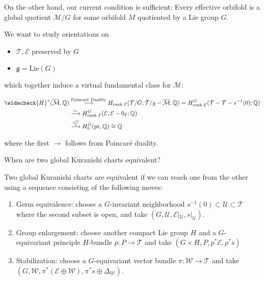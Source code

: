 On the other hand, our current condition is sufficient: Every effective orbifold is a global quotient $\mathcal{M}/G$ for some orbifold $M$ quotiented by a Lie group $G$.

We want to study orientations on
\begin{itemize}
\item $\mathcal{T}, \mathcal{E}$ preserved by $G$
\item $\mathfrak{g}=\text{Lie}(G)$
\end{itemize}

which together induce a virtual fundamental class for $\overline{\mathcal{M}}$:

\begin{align*}
\widecheck{H}^*(\overline{\mathcal{M}}, \mathbb{Q}) &\stackrel{\text{Poincaré Duality}}{\longrightarrow}H_{\text{rank } \mathcal{E}} (\mathcal{T}/G; \mathcal{T}/g - \overline{\mathcal{M}}, \mathbb{Q}) = H_{\text{rank } \mathcal{E}}^G (\mathcal{T}- \mathcal{T}-s^{-1}(0); \mathbb{Q}) \\
&\stackrel{s_*}{\longrightarrow} H_{\text{rank }\mathcal{E}}^G (\mathcal{E}, \mathcal{E}- 0_{\mathcal{E}}; \mathbb{Q}) \\
&\stackrel{\tau_{\mathcal{E}}^G}{\longrightarrow} H_0^G(\text{pt}, \mathbb{Q})\cong \mathbb{Q}
\end{align*}

where the first $\longrightarrow$ follows from Poincaré duality.

\begin{problem}

When are two global Kuranishi charts equivalent?

\end{problem}

\begin{proposition}

Two global Kuranishi charts are equivalent if we can reach one from the other using a sequence consisting of the following moves:
\begin{enumerate}
\item Germ equivalence: choose a $G$-invariant neighborhood $s^{-1}(0) \subset \mathcal{U}\subset \mathcal{T}$ where the second subset is open, and take $(G, \mathcal{U}, \mathcal{E}|_{\mathcal{U}}, s|_{\mathcal{U}})$.
\item Group enlargement: choose another compact Lie group $H$ and a $G$-equivariant principle $H$-bundle $p:P\to \mathcal{T}$ and take $(G\times H, P, p^* \mathcal{E}, p^* s)$
\item Stabilization: choose a $G$-equivariant vector bundle $\pi: \mathcal{W}\to \mathcal{T}$ and take $(G, \mathcal{W}, \pi^*(\mathcal{E}\oplus \mathcal{W}), \pi^* s \oplus \Delta_{\mathcal{W}})$.
\end{enumerate}

\end{proposition}

